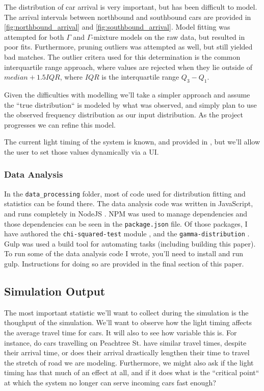 \documentclass[a4paper,12pt]{article}
\begin{document}
The distribution of car arrival is very important, but has been difficult to model. The arrival intervals between 
northbound and southbound cars are provided in \ref{fig:northbound_arrival} and \ref{fig:southbound_arrival}.
Model fitting was attempted for both $\Gamma$ and $\Gamma$-mixture models on the raw data, but resulted in poor
fits. Furthermore, pruning outliers was attempted as well, but still yielded bad matches. The outlier critera used for
this determination is the common interquartile range approach, where values are rejected when
they lie outside of $median + 1.5IQR$, where $IQR$ is the interquartile range $Q_3 - Q_1$.

Given the difficulties with modelling we'll take a simpler approach and assume the ``true distribution`` is modeled by what was observed,
and simply plan to use the observed frequency distribution as our input distribution. As the project progresses we can
refine this model.

The current light timing of the system is known, and provided in \cite{ngsim}, but we'll allow the user to set
those values dynamically via a UI.

\subsubsection{Data Analysis}
In the \texttt{data\_processing} folder, most of code used for distribution fitting and statistics can be found there.
The data analysis code was written in JavaScript, and runs completely in NodeJS \cite{nodejs}. NPM \cite{npm} was used
to manage dependencies and those dependencies can be seen in the \texttt{package.json} file. Of those packages, I have
authored the \texttt{chi-squared-test} module \cite{chiSquaredNpm}, and the \texttt{gamma-distribution}
\cite{gammaDistributionNpm}. Gulp \cite{gulp} was used a build tool for automating tasks (including building this paper).
To run some of the data analysis code I wrote, you'll need to install and run gulp. Instructions for doing so are
provided in the final section of this paper.

\subsection{Simulation Output}
The most important statistic we'll want to collect during the simulation is the thoughput of the simulation. We'll
want to observe how the light timing affects the average travel time for cars. It will also to see how variable this
is. For instance, do cars travelling on Peachtree St. have similar travel times, despite their arrival time, or does
their arrival drastically lengthen their time to travel the stretch of road we are modeling. Furthermore, we might also
ask if the light timing has that much of an effect at all, and if it does what is the ``critical point`` at which the
system no longer can serve incoming cars fast enough?
\end{document}
